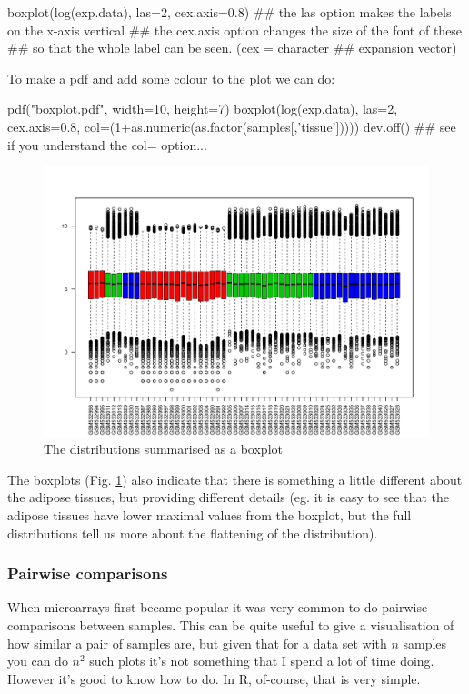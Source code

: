 \documentclass[11pt]{article}
\begin{document}
\begin{rcode}
  boxplot(log(exp.data), las=2, cex.axis=0.8)
  ## the las option makes the labels on the x-axis vertical
  ## the cex.axis option changes the size of the font of these
  ## so that the whole label can be seen. (cex = character
  ## expansion vector)
\end{rcode}

To make a pdf and add some colour to the plot we can do:

\begin{rcode}
  pdf("boxplot.pdf", width=10, height=7)
  boxplot(log(exp.data), las=2, cex.axis=0.8, col=(1+as.numeric(as.factor(samples[,'tissue']))))
  dev.off()
  ## see if you understand the col= option...
\end{rcode}

\begin{figure}[ht]
  \includegraphics[width=\textwidth]{images/boxplot}
  \caption{The distributions summarised as a boxplot}
  \label{boxplot}
\end{figure}

The boxplots (Fig. \ref{boxplot}) also indicate that there is something
a little different about the adipose tissues, but providing different
details (eg. it is easy to see that the adipose tissues have lower maximal
values from the boxplot, but the full distributions tell us more about the
flattening of the distribution).

\subsubsection{Pairwise comparisons}
\label{sec-1-3-2}
When microarrays first became popular it was very common to
do pairwise comparisons between samples. This can be quite useful
to give a visualisation of how similar a pair of samples are, but
given that for a data set with $n$ samples you can do $n^2$ such
plots it's not something that I spend a lot of time doing. However
it's good to know how to do. In R, of-course, that is very simple.
\end{document}
